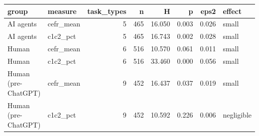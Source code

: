 \begin{tabular}{llrrrrrl}
\toprule
group & measure & task_types & n & H & p & eps2 & effect \\
\midrule
AI agents & cefr_mean & 5 & 465 & 16.050 & 0.003 & 0.026 & small \\
AI agents & c1c2_pct & 5 & 465 & 16.743 & 0.002 & 0.028 & small \\
Human & cefr_mean & 6 & 516 & 10.570 & 0.061 & 0.011 & small \\
Human & c1c2_pct & 6 & 516 & 33.460 & 0.000 & 0.056 & small \\
Human (pre-ChatGPT) & cefr_mean & 9 & 452 & 16.437 & 0.037 & 0.019 & small \\
Human (pre-ChatGPT) & c1c2_pct & 9 & 452 & 10.592 & 0.226 & 0.006 & negligible \\
\bottomrule
\end{tabular}
